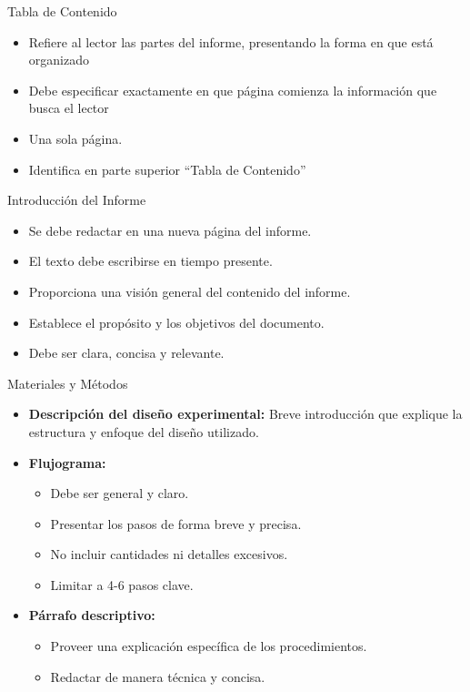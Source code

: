 \documentclass[
11pt, %
]{beamer}
\begin{document}
\begin{frame}{Tabla de Contenido}
	\begin{itemize}
		\item Refiere al lector las partes del informe, presentando la forma en que está organizado
		\item Debe especificar exactamente en que página comienza la información que busca el lector
		\item Una sola página.
		\item Identifica en parte superior “Tabla de Contenido”
	\end{itemize}
\end{frame}

\begin{frame}{Introducción del Informe}
	\begin{itemize}
		\item Se debe redactar en una nueva página del informe.
		\item El texto debe escribirse en tiempo presente.
		\item Proporciona una visión general del contenido del informe.
		\item Establece el propósito y los objetivos del documento.
		\item Debe ser clara, concisa y relevante.
	\end{itemize}
\end{frame}


\begin{frame}{Materiales y Métodos}
	\begin{itemize}
		\item \textbf{Descripción del diseño experimental:}
		      Breve introducción que explique la estructura y enfoque del diseño utilizado.

		\item \textbf{Flujograma:}
		      \begin{itemize}
			      \item Debe ser general y claro.
			      \item Presentar los pasos de forma breve y precisa.
			      \item No incluir cantidades ni detalles excesivos.
			      \item Limitar a 4-6 pasos clave.
		      \end{itemize}
		\item \textbf{Párrafo descriptivo:}
		      \begin{itemize}
			      \item Proveer una explicación específica de los procedimientos.
			      \item Redactar de manera técnica y concisa.
		      \end{itemize}
	\end{itemize}
\end{frame}
\end{document}
